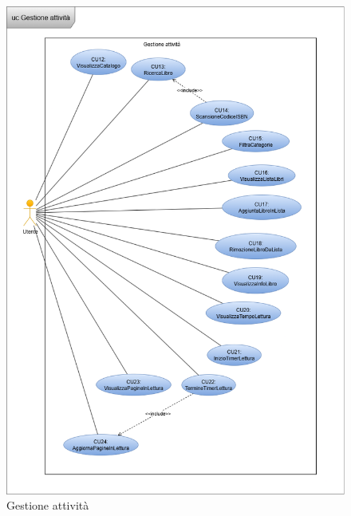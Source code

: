 \documentclass{article}
\begin{document}
\begin{figure}[H]
  \centering
  \includegraphics[width=0.72\linewidth]{cu_attivita.png}
  \caption{Gestione attività}
  \label{fig:sitemap}
\end{figure}
\end{document}
